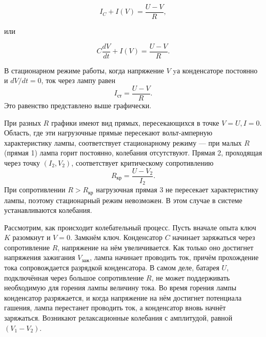 \documentclass{article}
\begin{document}
\begin{equation*}
    I_C + I(V) = \frac{U - V}{R},
\end{equation*}

или 

\begin{equation*}
		C \frac{dV}{dt} + I(V) = \frac{U - V}{R}.
\end{equation*}

В стационарном режиме работы, когда напряжение $V$ yа конденсаторе постоянно и
$dV / dt = 0$, ток через лампу равен
\begin{equation*}
		I_\text{ст} = \frac{U - V}{R}.
\end{equation*}
Это равенство представлено выше графически.

При разных $R$ графики имеют вид прямых, пересекающихся в точке $V = U, I = 0$. Область,
где эти нагрузочные прямые пересекают вольт-амперную характеристику лампы, соответствует
стационарному режиму --- при малых $R$ (прямая 1) лампа горит постоянно, колебания
отсутствуют. Прямая 2, проходящая через точку $(I_2, V_2)$, соответствует критическому
сопротивлению 
\begin{equation*}
	R_\text{кр} = \frac{U - V_2}{I_2}.
\end{equation*}
При сопротивлении $R > R_\text{кр}$ нагрузочная прямая 3 не пересекает характеристику
лампы, поэтому стационарный режим невозможен. В этом случае в системе устанавливаются
колебания.

Рассмотрим, как происходит колебательный процесс. Пусть  вначале опыта ключ $K$
разомкнут и $V = 0$. Замкнём ключ. Конденсатор $C$ начинает заряжаться через
сопротивление $R$, напряжение на нём увеличивается. Как только оно достигнет
напряжения зажигания $V_\text{заж}$, лампа начинает проводить ток, причём прохождение
тока сопровождается разрядкой конденсатора. В самом деле, батарея $U$, подключённая
через большое сопротивление $R$, не может поддерживать необходимую для горения лампы
величину тока. Во время горения лампы конденсатор разряжается, и когда напряжение на
нём достигнет потенциала гашения, лампа перестанет проводить ток, а конденсатор вновь
начнёт заряжаться. Возникают релаксационные колебания с амплитудой, равной $(V_1 - V_2)$.
\end{document}
